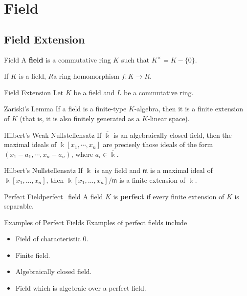 
\chapter{Field}
\section{Field Extension}
\begin{definition}{Field}{}
    A \textbf{field} is a commutative ring $K$ such that $K^{\times}=K-\{0\}$.
\end{definition}

\begin{proposition}{}{}
    If $K$ is a field, $R$a ring homomorphism $f:K\to R$.
\end{proposition}

\begin{definition}{Field Extension}{}
    Let $K$ be a field and $L$ be a commutative ring. 
\end{definition}


\begin{lemma}{Zariski's Lemma}{}
    If a field is a finite-type $K$-algebra, then it is a finite extension of $K$ (that is, it is also finitely generated as a $K$-linear space).
\end{lemma}


\begin{theorem}{Hilbert's Weak Nullstellensatz}{}
    If $\overline{\Bbbk}$ is an algebraically closed field, then the maximal ideals of $\overline{\Bbbk}\left[x_1, \cdots, x_n\right]$ are precisely those ideals of the form $\left(x_1-a_1, \cdots, x_n-a_{n}\right)$, where $a_i\in \overline{\Bbbk}$. 
\end{theorem}


\begin{theorem}{Hilbert's Nullstellensatz}{}
    If $\Bbbk$ is any field and $\mathfrak{m}$ is a maximal ideal of $\Bbbk\left[x_1, \ldots, x_n\right]$, then $\Bbbk\left[x_1, \ldots, x_n\right]/\mathfrak{m}$ is a finite extension of $\Bbbk$.
\end{theorem}


\begin{definition}{Perfect Field}{perfect_field}
    A field $K$ is \textbf{perfect} if every finite extension of $K$ is separable.
\end{definition}

\begin{example}{Examples of Perfect Fields}{}
    Examples of perfect fields include
    \begin{itemize}
        \item Field of characteristic $0$.
        \item Finite field.
        \item Algebraically closed field.
        \item Field which is algebraic over a perfect field.
    \end{itemize}
\end{example}

